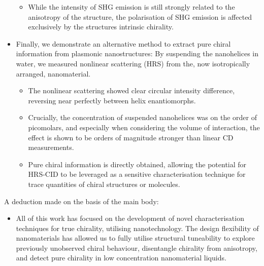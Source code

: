 \begin{itemize}
\begin{itemize}
        \item While the intensity of SHG emission is still strongly related to the anisotropy of the structure, the polarisation of SHG emission is affected exclusively by the structures intrinsic chirality.
    \end{itemize}
    \item Finally, we demonstrate an alternative method to extract pure chiral information from plasmonic nanostructures: By suspending the nanohelices in water, we measured nonlinear scattering (HRS) from the, now isotropically arranged, nanomaterial.
    \begin{itemize}
        \item The nonlinear scattering showed clear circular intensity difference, reversing near perfectly between helix enantiomorphs.
        \item Crucially, the concentration of suspended nanohelices was on the order of picomolars, and especially when considering the volume of interaction, the effect is shown to be orders of magnitude stronger than linear CD measurements.
        \item Pure chiral information is directly obtained, allowing the potential for HRS-CID to be leveraged as a sensitive characterisation technique for trace quantities of chiral structures or molecules.
    \end{itemize}
\end{itemize}

A deduction made on the basis of the main body:
\begin{itemize}
    \item All of this work has focused on the development of novel characterisation techniques for true chirality, utilising nanotechnology. The design flexibility of nanomaterials has allowed us to fully utilise structural tuneability to explore previously unobserved chiral behaviour, disentangle chirality from anisotropy, and detect pure chirality in low concentration nanomaterial liquids.
\end{itemize}

